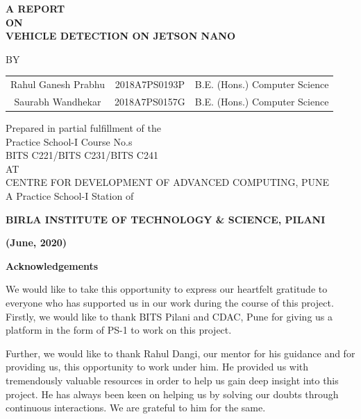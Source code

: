 \documentclass[12pt,letterpaper]{article}
\begin{document}
\begin{center}
    { \large \textbf{
    A REPORT \\
    ON \\
    VEHICLE DETECTION ON JETSON NANO
}
    }

\vskip 1in

{\large BY} \\
\bigskip
\begin{tabular}{c c c}
    {\large  Rahul Ganesh Prabhu} & {\large 2018A7PS0193P} & {\large B.E. (Hons.) Computer Science} \\
    {\large  Saurabh Wandhekar} & {\large 2018A7PS0157G} & {\large B.E. (Hons.) Computer Science} \\
\end{tabular}

\vskip 1in

Prepared in partial fulfillment of the \\
Practice School-I Course No.s \\
BITS C221/BITS C231/BITS C241 \\

\bigskip
{\large AT \\
    CENTRE FOR DEVELOPMENT OF ADVANCED COMPUTING, PUNE \\
    A Practice School-I Station of
}

\vskip 1in


{\large \textbf{BIRLA INSTITUTE OF TECHNOLOGY \& SCIENCE, PILANI}}

{\large \textbf{(June, 2020)}}


\end{center}


\pagebreak



\thispagestyle{empty}

\begin{center}
    { \Large \textbf{Acknowledgements}}
\end{center}

We would like to take this opportunity to express our heartfelt gratitude to everyone who has supported us in our work during the course of this project. Firstly, we would like to thank BITS Pilani and CDAC, Pune for giving us a platform in the form of PS-1 to work on this project. 

Further, we would like to thank Rahul Dangi, our mentor for his guidance and for providing us, this opportunity to work under him. He provided us with tremendously valuable resources in order to help us gain deep insight into this project. He has always been keen on helping us by solving our doubts through continuous interactions. We are grateful to him for the same. 
\end{document}
